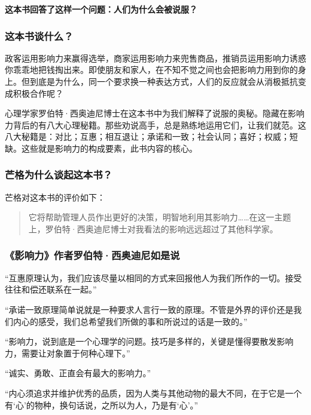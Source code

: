 \cleardoublepage
{}


\begin{BookSummaryBox}
\textbf{这本书回答了这样一个问题：人们为什么会被说服？}
\par
\end{BookSummaryBox}

\subsubsection*{这本书谈什么？}

政客运用影响力来赢得选举，商家运用影响力来兜售商品，推销员运用影响力诱惑你乖乖地把钱掏出来。即使朋友和家人，在不知不觉之间也会把影响力用到你的身上。但到底是为什么，同一个要求换一种表达方式，人们的反应就会从消极抵抗变成积极合作呢？
\par

心理学家罗伯特·西奥迪尼博士在这本书中为我们解释了说服的奥秘。隐藏在影响力背后的有八大心理秘籍。那些劝说高手，总是熟练地运用它们，让我们就范。这八大秘籍是：对比；互惠；相互退让；承诺和一致；社会认同；喜好；权威；短缺。这些就是影响力的构成要素，此书内容的核心。
\par

\subsubsection*{芒格为什么谈起这本书？}

芒格对这本书的评价如下：
\par

\begin{quotation}
它将帮助管理人员作出更好的决策，明智地利用其影响力……在这一主题上，罗伯特·西奥迪尼博士对我看法的影响远远超过了其他科学家。
\par
\end{quotation}

\subsubsection*{《影响力》作者罗伯特·西奥迪尼如是说}

“互惠原理认为，我们应该尽量以相同的方式来回报他人为我们所作的一切。接受往往和偿还联系在一起。”
\par

“承诺一致原理简单说就是一种要求人言行一致的原理。不管是外界的评价还是我们内心的感受，我们总希望我们所做的事和所说过的话是一致的。”
\par

“影响力，说到底是一个心理学的问题。技巧是多样的，关键是懂得要散发影响力，需要让对象置于何种心理下。”
\par

“诚实、勇敢、正直会有最大的影响力。”
\par

“内心须追求并维护优秀的品质，因为人类与其他动物的最大不同，在于它是一个有‘心’的物种，换句话说，之所以为人，乃是有‘心’。”
\par
